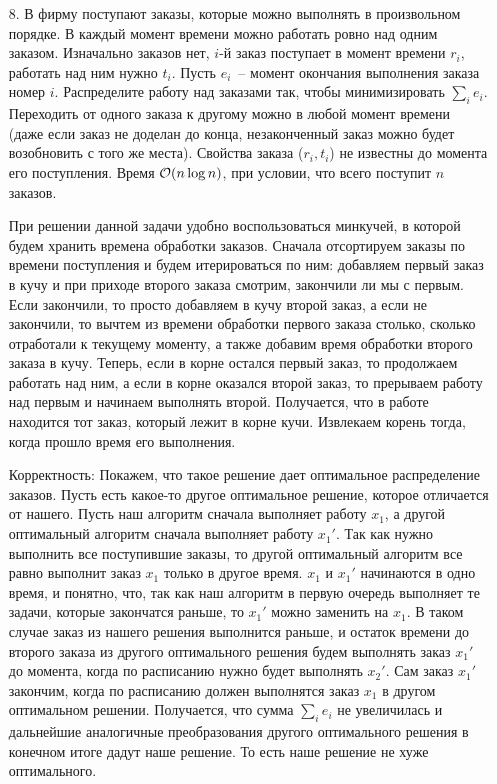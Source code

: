 \begin{enumerate}
  \item[8.]
    В фирму поступают заказы, которые можно выполнять в произвольном
    порядке. В каждый момент времени можно работать ровно над одним
    заказом.  Изначально заказов нет, $i$-й заказ поступает в момент
    времени $r_i$, работать над ним нужно $t_i$. Пусть $e_i$~-- момент
    окончания выполнения заказа номер $i$. Распределите работу над
    заказами так, чтобы минимизировать $\sum_i e_i$. Переходить от
    одного заказа к другому можно в любой момент времени (даже если
    заказ не доделан до конца, незаконченный заказ можно будет 
    возобновить с того же места). 
    Свойства заказа ($r_i, t_i$) не известны до
    момента его поступления. Время $\mathcal{O}(n \log n)$, при условии, что
    всего поступит $n$ заказов.
    \begin{solution}
        При решении данной задачи удобно воспользоваться минкучей, в которой будем хранить времена обработки заказов. Сначала отсортируем заказы по времени поступления и будем итерироваться по ним: добавляем первый заказ в кучу и при приходе второго заказа смотрим, закончили ли мы с первым. Если закончили, то просто добавляем в кучу второй заказ, а если не закончили, то вычтем из времени обработки первого заказа столько, сколько отработали к текущему моменту, а также добавим время обработки второго заказа в кучу. Теперь, если в корне остался первый заказ, то продолжаем работать над ним, а если в корне оказался второй заказ, то прерываем работу над первым и начинаем выполнять второй. Получается, что в работе находится тот заказ, который лежит в корне кучи. Извлекаем корень тогда, когда прошло время его выполнения.

        Корректность:
        Покажем, что такое решение дает оптимальное распределение заказов. Пусть есть какое-то другое оптимальное решение, которое отличается от нашего. Пусть наш алгоритм сначала выполняет работу $x_1$, а другой оптимальный алгоритм сначала выполняет работу $x_1'$. Так как нужно выполнить все поступившие заказы, то другой оптимальный алгоритм все равно выполнит заказ $x_1$ только в другое время. $x_1$ и $x_1'$ начинаются в одно время, и понятно, что, так как наш алгоритм в первую очередь выполняет те задачи, которые закончатся раньше, то $x_1'$ можно заменить на $x_1$. В таком случае заказ из нашего решения выполнится раньше, и остаток времени до второго заказа из другого оптимального решения будем выполнять заказ $x_1'$ до момента, когда по расписанию
        нужно будет выполнять $x_2'$. Сам заказ $x_1'$ закончим, когда по расписанию должен выполнятся заказ $x_1$ в другом оптимальном решении. Получается, что сумма $\sum_i e_i$ не увеличилась и дальнейшие аналогичные преобразования другого оптимального решения в конечном итоге дадут наше решение. То есть наше решение не хуже оптимального.


\end{solution}
\end{enumerate}

